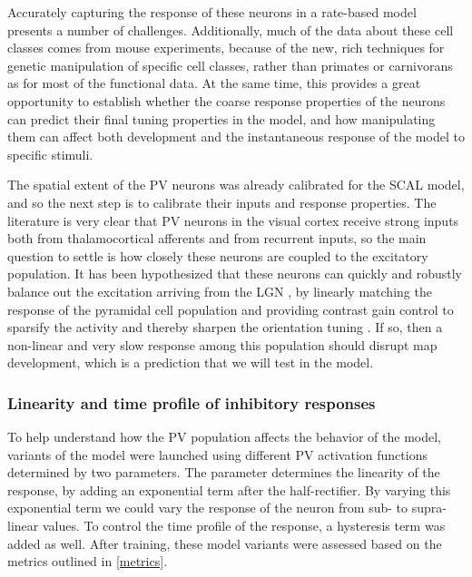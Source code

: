Accurately capturing the response of these neurons in a rate-based
model presents a number of challenges.
Additionally, much of the data about these cell classes comes from
mouse experiments, because of the new, rich techniques for genetic
manipulation of specific cell classes, rather than primates or
carnivorans as for most of the functional data. At the same time, this
provides a great opportunity to establish whether
the coarse response properties of the neurons can predict their final
tuning properties in the model, and how manipulating them can affect
both development and the instantaneous response of the model to
specific stimuli.

The spatial extent of the PV neurons was already calibrated for the
SCAL model, and so the next step is to calibrate their inputs and
response properties. The 
literature is very clear that PV neurons in the visual cortex receive
strong inputs both from thalamocortical afferents and from recurrent
inputs, so the main question to settle is how closely these neurons
are coupled to the excitatory population. It has been hypothesized
that these neurons can quickly and robustly balance out the excitation
arriving from the LGN \citep{Swadlow2003, Burkhalter2008}, by linearly
matching the response of the pyramidal cell population and providing
contrast gain control to sparsify the activity and thereby sharpen the
orientation tuning \citep{Wilson2012}.  If so, then a non-linear and
very slow response among this population should disrupt map
development, which is a prediction that we will test in the model.

\subsubsection{Linearity and time profile of inhibitory responses}

To help understand how the PV population affects the behavior of the
model, variants of the model were launched using different PV
activation functions determined by two parameters. The parameter
determines the linearity of the response, by adding an exponential term after the
half-rectifier. By varying this exponential term we could vary the
response of the neuron from sub- to supra-linear
values. To control the time profile of the response, a hysteresis term
was added as well. After training, these model variants were assessed
based on the metrics outlined in \ref{metrics}.

